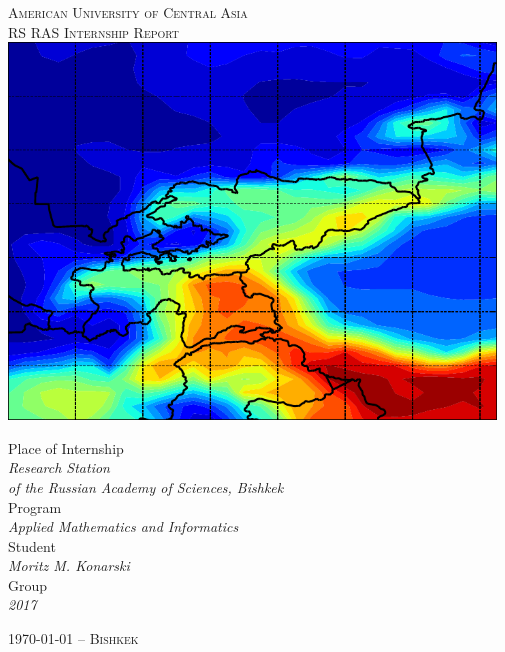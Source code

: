 \documentclass[a4paper, 12pt, reqno]{article}
\newcommand{\titl}{RS RAS Internship Report}
\newcommand{\auth}{Moritz M. Konarski}
\begin{document}
\thispagestyle{empty}
\begin{center}
    \Large
    \vspace{10pt}
    \textsc{American University of Central Asia}\\[10pt]
    \textsc{\titl{}}\\ [1.5cm]

    \includegraphics[height=10cm]{../graphics/title_pic}

    \vspace{1.5cm}

    \normalsize
    Place of Internship\\
    \textit{Research Station \\
    of the Russian Academy of Sciences, Bishkek}\\[10pt]

    Program\\
    \textit{Applied Mathematics and Informatics}\\[10pt]

    Student\\
    \textit{\auth{}}\\[10pt]

    Group\\
    \textit{2017}\\

    \vfill

    \large
    \textsc{\today{} -- Bishkek}
    \normalsize
\end{center}

\restoregeometry
\newpage
\end{document}
